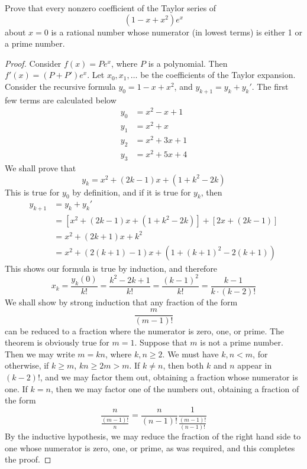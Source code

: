 \begin{exercise}
    Prove that every nonzero coefficient of the Taylor series of
    \[ (1 - x + x^2) e^x \]
    about $x = 0$ is a rational number whose numerator (in lowest terms) is either 1 or a prime number.
\end{exercise}
\begin{proof}
    Consider $f(x) = P e^x$, where $P$ is a polynomial. Then $f'(x) = (P + P')e^x$. Let $x_0, x_1, \dots$ be the coefficients of the Taylor expansion. Consider the recursive formula $y_0 = 1 - x + x^2$, and $y_{k + 1} = y_k + y_k'$. The first few terms are calculated below
    \begin{align*}
        y_0 &= x^2 - x + 1\\
        y_1 &= x^2 + x\\
        y_2 &= x^2 + 3x + 1\\
        y_3 &= x^2 + 5x + 4
    \end{align*}
    We shall prove that
    \[ y_k = x^2 + (2k - 1)x + (1 + k^2 - 2k) \]
    This is true for $y_0$ by definition, and if it is true for $y_k$, then
    \begin{align*}
        y_{k+1} &= y_k + y_k'\\
        &= [x^2 + (2k - 1)x + (1 + k^2 - 2k)] + [2x + (2k - 1)]\\
        &= x^2 + (2k + 1)x + k^2\\
        &= x^2 + (2(k+1) - 1)x + (1 + (k+1)^2 - 2(k+1))
    \end{align*}
    This shows our formula is true by induction, and therefore
    \[ x_k = \frac{y_k(0)}{k!} = \frac{k^2 - 2k + 1}{k!} = \frac{(k-1)^2}{k!} = \frac{k-1}{k \cdotp (k-2)!} \]
    We shall show by strong induction that any fraction of the form
    \[ \frac{m}{(m-1)!} \]
    can be reduced to a fraction where the numerator is zero, one, or prime. The theorem is obviously true for $m = 1$. Suppose that $m$ is not a prime number. Then we may write $m = kn$, where $k,n \geq 2$. We must have $k,n < m$, for otherwise, if $k \geq m$, $kn \geq 2m > m$. If $k \neq n$, then both $k$ and $n$ appear in $(k - 2)!$, and we may factor them out, obtaining a fraction whose numerator is one. If $k = n$, then we may factor one of the numbers out, obtaining a fraction of the form
    \[ \frac{n}{\frac{(m-1)!}{n}} = \frac{n}{(n-1)!} \frac{1}{\frac{(m-1)!}{(n-1)!}} \]
    By the inductive hypothesis, we may reduce the fraction of the right hand side to one whose numerator is zero, one, or prime, as was required, and this completes the proof.
\end{proof}

